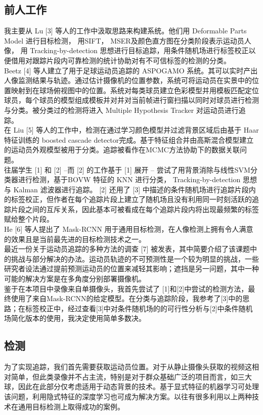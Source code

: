 \documentclass{article}
\begin{document}
\subsection{前人工作}
我主要从 Lu [3] 等人的工作中汲取思路来构建系统。他们用 Deformable Parts Model 进行目标检测， 用SIFT， MSER及颜色直方图在分类阶段表示运动员人像， 用 Tracking-by-detection 思想进行目标追踪，用条件随机场进行标签校正以便借用对跟踪片段内可靠检测的统计协助对有不可信标签的检测的分类。\\
Beetz [4] 等人建立了用于足球运动员追踪的 ASPOGAMO 系统。其可以实时产出人像监测结果与轨迹。通过估计摄像机的位置参数，系统可将运动员在实景中的位置映射到在球场俯视图中的位置。系统对每类球员建立色彩模型并用模板匹配定位球员，每个球员的模型组成模板并对并对当前帧进行窗扫描以同时对球员进行检测与分类。被分类过的检测将进入 Multiple Hypothesis Tracker 对运动员进行追踪。\\
在 Liu [5] 等人的工作中，检测在通过学习颜色模型并过滤背景区域后由基于 Haar 特征训练的 boosted cascade detector完成。基于特征组合并由高斯混合模型建立的运动员外观模型被用于分类。追踪被看作在MCMC方法协助下的数据关联问题。\\
往届学生 [1] 和 [2] --而 [2] 的工作基于 [1] 展开 -- 尝试了用背景消除与线性SVM分类器进行检测，基于BOVW 特征的 KNN 进行分类， Tracking-by-detection 思想与 Kalman 滤波器进行追踪。 [2] 还用了 [3] 中描述的条件随机场进行追踪片段内的标签校正，但作者在每个追踪片段上建立了随机场且没有利用同一时刻活跃的追踪片段之间的互斥关系，因此基本可被看成在每个追踪片段内将出现最频繁的标签赋给整个片段。\\
He [6] 等人提出了 Mask-RCNN 用于通用目标检测，在人像检测上拥有令人满意的效果且是当前最先进的目标检测技术之一。\\
最近一份关于运动员追踪的多种方法的调查 [7] 被发表，其中简要介绍了该课题中的挑战与部分解决的办法。运动员轨迹的不可预测性是一个较为明显的挑战，一些研究者设法通过提前预测运动员的位置来减轻其影响；遮挡是另一问题，其中一种可能的解决方案是在多角度分别部署摄像机。\\
鉴于在本项目中录像来自单摄像头，我首先尝试了 [1]和[2]中尝试的检测方法，最终使用了来自Mask-RCNN的给定模型。在分类与追踪阶段，我参考了[3]中的思路；在标签校正中，经过查看[3]中对条件随机场的的可行性分析与[2]中条件随机场简化版本的使用，我决定使用简单多数决。\\
\subsection{检测}
为了实现追踪，我们首先需要获取运动员位置。对于从静止摄像头获取的视频这相对简单，但此类录像并不占主流，特别是对于群众基础广泛的项目而言，如三大球，因此在此部分仅考虑适用于动态背景的技术。基于显式特征的机器学习可处理该问题，利用隐式特征的深度学习也可成为解决方案。以往有很多利用以上两种技术在通用目标检测上取得成功的案例。
\end{document}
